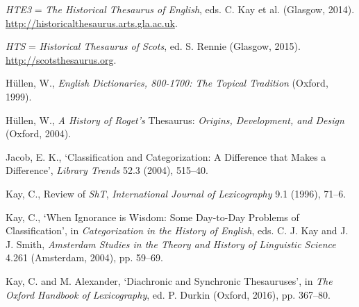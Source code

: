 \begin{list}{}
\item %
\textit{HTE3} = \textit{The Historical Thesaurus of English}, eds. C. Kay et al. (Glasgow, 2014). \url{http://historicalthesaurus.arts.gla.ac.uk}.

\item %
\textit{HTS} = \textit{Historical Thesaurus of Scots}, ed. S. Rennie (Glasgow, 2015). \url{http://scotsthesaurus.org}.

\item %
Hüllen, W., \textit{English Dictionaries, 800-1700: The Topical Tradition} (Oxford, 1999).

\item %
Hüllen, W., \textit{A History of Roget's} Thesaurus: \textit{Origins, Development, and Design} (Oxford, 2004).



\item %
Jacob, E. K., `Classification and Categorization: A Difference that Makes a Difference', \textit{Library Trends} 52.3 (2004), 515–40.

\item %
Kay, C., Review of \textit{ShT}, \textit{International Journal of Lexicography} 9.1 (1996), 71–6.

\item %
Kay, C., `When Ignorance is Wisdom: Some Day-to-Day Problems of Classification', in \textit{Categorization in the History of English}, eds. C. J. Kay and J. J. Smith, \textit{Amsterdam Studies in the Theory and History of Linguistic Science} 4.261 (Amsterdam, 2004), pp. 59–69.


\item %
Kay, C. and M. Alexander, `Diachronic and Synchronic Thesauruses', in \textit{The Oxford Handbook of Lexicography}, ed. P. Durkin (Oxford, 2016), pp. 367–80.


\end{list}
